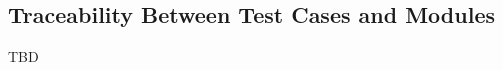 \documentclass[10pt,titlepage]{article}
\begin{document}


		


					
					
					
					
					

					
					
					
					




\subsection{Traceability Between Test Cases and Modules}

TBD


\newpage
\end{document}
